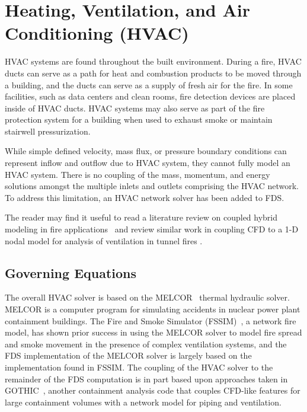 

\chapter{Heating, Ventilation, and Air Conditioning (HVAC)}

HVAC systems are found throughout the built environment.  During a fire, HVAC ducts can serve as a path for heat and combustion products to be moved through a building, and the ducts can serve as a supply of fresh air for the fire.  In some facilities, such as data centers and clean rooms, fire detection devices are placed inside of HVAC ducts. HVAC systems may also serve as part of the fire protection system for a building when used to exhaust smoke or maintain stairwell pressurization.

While simple defined velocity, mass flux, or pressure boundary conditions can represent inflow and outflow due to HVAC system, they cannot fully model an HVAC system. There is no coupling of the mass, momentum, and energy solutions amongst the multiple inlets and outlets comprising the HVAC network. To address this limitation, an HVAC network solver has been added to FDS.

The reader may find it useful to read a literature review on coupled hybrid modeling in fire applications~\cite{Ralph:1} and review similar work in coupling CFD to a 1-D nodal model for analysis of ventilation in tunnel fires \cite{Colella:2010, Colella:2011}.

\section{Governing Equations}

The overall HVAC solver is based on the MELCOR~\cite{MELCOR} thermal hydraulic solver.  MELCOR is a computer program for simulating accidents in nuclear power plant containment buildings.
The Fire and Smoke Simulator (FSSIM)~\cite{FSSIM}, a network fire model, has shown prior success in using the MELCOR solver to model fire spread and smoke movement
in the presence of complex ventilation systems, and the FDS implementation of the MELCOR solver is largely based on the implementation found in FSSIM.  The coupling of the HVAC solver to the remainder of the FDS computation is in part based upon approaches taken in GOTHIC~\cite{GOTHIC}, another containment analysis code that couples CFD-like features for large containment volumes with a network model for piping and ventilation.

